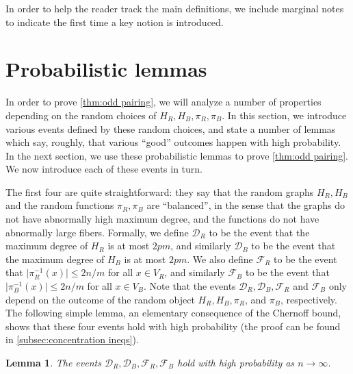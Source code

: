 \documentclass[11pt,reqno,oneside]{amsart}
\newtheorem{lemma}[theorem]{Lemma}
\theoremstyle{definition}
\newcommand\margindef[1]{\marginpar{\textcolor{gray!70!black}{\scriptsize #1}}}
\newcommand\ab[1]{\lvert#1\rvert}
\newcommand\1{\mathbf{1}}
\let\leq\leqslant
\begin{document}
In order to help the reader track the main definitions, we include marginal notes to indicate the first time a key notion is introduced.







\section{Probabilistic lemmas}\label{sec:probabilistic lemmas}
In order to prove \cref{thm:odd pairing}, we will analyze a number of properties depending on the random choices of $H_R,H_B,\pi_R,\pi_B$. In this section, we introduce various events defined by these random choices, and state a number of lemmas which say, roughly, that various ``good'' outcomes happen with high probability. In the next section, we use these probabilistic lemmas to prove \cref{thm:odd pairing}. We now introduce each of these events in turn.

The first four are quite straightforward: they say that the random graphs $H_R,H_B$ and the random functions $\pi_R,\pi_B$ are ``balanced'', in the sense that the graphs do not have abnormally high maximum degree, and the functions do not have abnormally large fibers. Formally, we define $\mathcal D_R$ to be the event\margindef{{$\mathcal D_R, \mathcal D_B$}} that the maximum degree of $H_R$ is at most $2pm$, and similarly $\mathcal D_B$ to be the event that the maximum degree of $H_B$ is at most $2pm$. We also define $\mathcal F_R$ to be the event that $\ab{\pi_R^{-1}(x)}\leq 2n/m$ for all $x \in V_R$, and\margindef{{$\mathcal F_R, \mathcal F_B$}} similarly $\mathcal F_B$ to be the event that $\ab{\pi_B^{-1}(x)}\leq 2n/m$ for all $x \in V_B$. Note that the events $\mathcal D_R, \mathcal D_B, \mathcal F_R$ and $\mathcal F_B$ only depend on the outcome of the random object $H_R, H_B, \pi_R$, and $\pi_B$, respectively. The following simple lemma, an elementary consequence of the Chernoff bound, shows that these four events hold with high probability (the proof can be found in \cref{subsec:concentration ineqs}).
\begin{lemma}\label{lem:easy chernoff}
	The events $\mathcal D_R, \mathcal D_B, \mathcal F_R, \mathcal F_B$ hold with high probability as $n \to \infty$.
\end{lemma}
\end{document}
